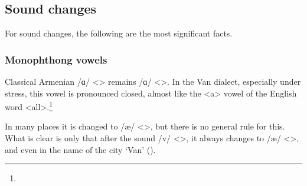 \subsection{Sound changes}
For sound changes, the following are the most significant facts. 


\begin{adjarianpage}\label{page:141}\end{adjarianpage}%

\subsubsection{Monophthong vowels}
\label{sec:Van:phono:soundchange:monovowel:a}


Classical Armenian /ɑ/ <> remains /ɑ/ <>. In the Van dialect, especially under stress, this vowel is pronounced closed, almost like the <a> vowel of the English word <all>.\footnote{} 


In many places it is changed to /æ/ <>, but there is no general rule for this. What is clear is only that after the sound /v/ <>, it always changes to /æ/ <>, and even in the name of the city `Van' ().

